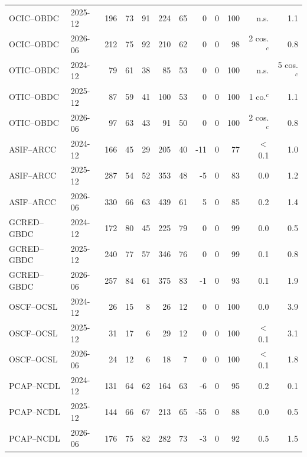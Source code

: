 \documentclass[12pt]{standalone}
\begin{document}
\begin{tabular}{llrrrrrrrrrr}
OCIC--OBDC & 2025-12 & 196 & 73 & 91 & 224 & 65 & 0 & 0 & 100 & n.s. & 1.1 \\
OCIC--OBDC & 2026-06 & 212 & 75 & 92 & 210 & 62 & 0 & 0 & 98 & 2 cos.$^{c}$ & 0.8 \\
OTIC--OBDC & 2024-12 & 79 & 61 & 38 & 85 & 53 & 0 & 0 & 100 & n.s. & 5 cos.$^{c}$ \\
OTIC--OBDC & 2025-12 & 87 & 59 & 41 & 100 & 53 & 0 & 0 & 100 & 1 co.$^{c}$ & 1.1 \\
OTIC--OBDC & 2026-06 & 97 & 63 & 43 & 91 & 50 & 0 & 0 & 100 & 2 cos.$^{c}$ & 0.8 \\
ASIF--ARCC & 2024-12 & 166 & 45 & 29 & 205 & 40 & -11 & 0 & 77 & $<$0.1 & 1.0 \\
ASIF--ARCC & 2025-12 & 287 & 54 & 52 & 353 & 48 & -5 & 0 & 83 & 0.0 & 1.2 \\
ASIF--ARCC & 2026-06 & 330 & 66 & 63 & 439 & 61 & 5 & 0 & 85 & 0.2 & 1.4 \\
GCRED--GBDC & 2024-12 & 172 & 80 & 45 & 225 & 79 & 0 & 0 & 99 & 0.0 & 0.5 \\
GCRED--GBDC & 2025-12 & 240 & 77 & 57 & 346 & 76 & 0 & 0 & 99 & 0.1 & 0.8 \\
GCRED--GBDC & 2026-06 & 257 & 84 & 61 & 375 & 83 & -1 & 0 & 93 & 0.1 & 1.9 \\
OSCF--OCSL & 2024-12 & 26 & 15 & 8 & 26 & 12 & 0 & 0 & 100 & 0.0 & 3.9 \\
OSCF--OCSL & 2025-12 & 31 & 17 & 6 & 29 & 12 & 0 & 0 & 100 & $<$0.1 & 3.1 \\
OSCF--OCSL & 2026-06 & 24 & 12 & 6 & 18 & 7 & 0 & 0 & 100 & $<$0.1 & 1.8 \\
PCAP--NCDL & 2024-12 & 131 & 64 & 62 & 164 & 63 & -6 & 0 & 95 & 0.2 & 0.1 \\
PCAP--NCDL & 2025-12 & 144 & 66 & 67 & 213 & 65 & -55 & 0 & 88 & 0.0 & 0.5 \\
PCAP--NCDL & 2026-06 & 176 & 75 & 82 & 282 & 73 & -3 & 0 & 92 & 0.5 & 1.5 \\
\bottomrule\end{tabular}
\end{document}
